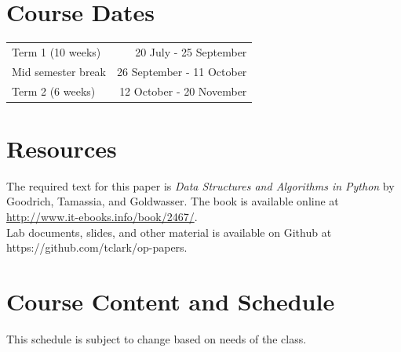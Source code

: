 \documentclass{article}
\begin{document}
\section*{Course Dates}
\begin{tabular}{lr}
Term 1 (10 weeks) & 20 July - 25 September \\
Mid semester break & 26 September - 11 October \\
Term 2 (6 weeks) & 12 October - 20 November \\
\end{tabular}


\section*{Resources}
The required text for this paper is \emph{Data Structures and Algorithms in Python} by Goodrich, Tamassia, and Goldwasser.  The book is available online at \url{http://www.it-ebooks.info/book/2467/}.
\\

Lab documents, slides, and other material is available on Github at https://github.com/tclark/op-papers.

\newpage 

\section*{Course Content and Schedule}
This schedule is subject to change based on needs of the class.
\end{document}
